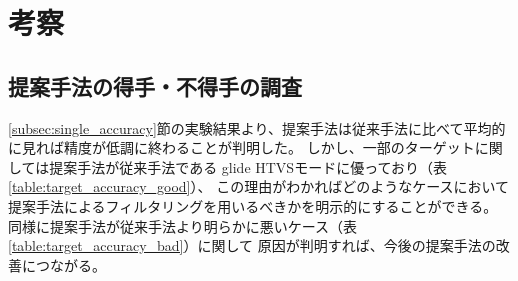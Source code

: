 \chapter{考察}

\section{提案手法の得手・不得手の調査}
\ref{subsec:single_accuracy}節の実験結果より、提案手法は従来手法に比べて平均的に見れば精度が低調に終わることが判明した。
しかし、一部のターゲットに関しては提案手法が従来手法である glide HTVSモードに優っており（表\ref{table:target_accuracy_good}）、
この理由がわかればどのようなケースにおいて提案手法によるフィルタリングを用いるべきかを明示的にすることができる。
同様に提案手法が従来手法より明らかに悪いケース（表\ref{table:target_accuracy_bad}）に関して
原因が判明すれば、今後の提案手法の改善につながる。

